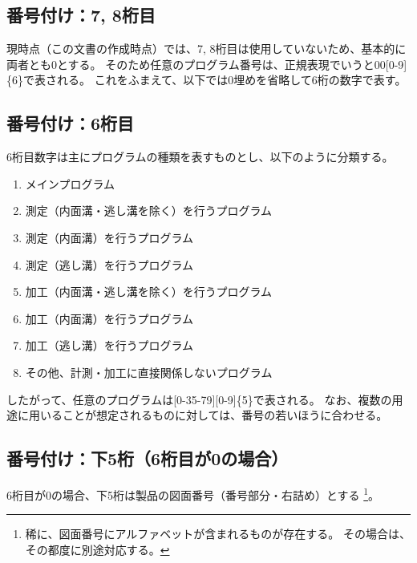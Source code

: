\subsection{番号付け：7, 8桁目}
現時点（この文書の作成時点）では、7, 8桁目は使用していないため、基本的に両者とも0とする。
そのため任意のプログラム番号は、正規表現でいうと00[0-9]\{6\}で表される。
これをふまえて、以下では0埋めを省略して6桁の数字で表す。


\subsection{番号付け：6桁目}
6桁目数字は主にプログラムの種類を表すものとし、以下のように分類する。
\begin{enumerate}[start=0]
\item メインプログラム
\item 測定（内面溝・逃し溝を除く）を行うプログラム
\item 測定（内面溝）を行うプログラム
\item 測定（逃し溝）を行うプログラム
\addtocounter{enumi}{1}
\item 加工（内面溝・逃し溝を除く）を行うプログラム
\item 加工（内面溝）を行うプログラム
\item 加工（逃し溝）を行うプログラム
\addtocounter{enumi}{1}
\item その他、計測・加工に直接関係しないプログラム
\end{enumerate}
したがって、任意のプログラムは[0-35-79][0-9]\{5\}で表される。
なお、複数の用途に用いることが想定されるものに対しては、番号の若いほうに合わせる。



\subsection{番号付け：下5桁（6桁目が0の場合）}
6桁目が0の場合、下5桁は製品の図面番号（番号部分・右詰め）とする
\footnote{稀に、図面番号にアルファベットが含まれるものが存在する。
その場合は、その都度に別途対応する。}。



